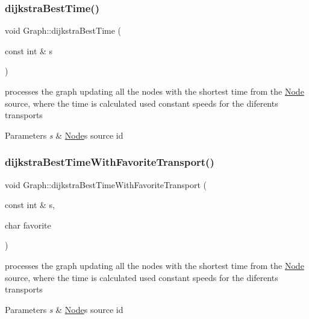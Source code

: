 \subsubsection{\texorpdfstring{dijkstra\+Best\+Time()}{dijkstraBestTime()}}
{\footnotesize\ttfamily void Graph\+::dijkstra\+Best\+Time (\begin{DoxyParamCaption}\item[{const int \&}]{s }\end{DoxyParamCaption})}



processes the graph updating all the nodes with the shortest time from the \hyperlink{class_node}{Node} source, where the time is calculated used constant speeds for the diferents transports 


\begin{DoxyParams}{Parameters}
{\em s} & \hyperlink{class_node}{Node}\textquotesingle{}s source id \\
\hline
\end{DoxyParams}
\mbox{\label{class_graph_a7bc7e3e61b1a753e8e043cf3e713cdc4}} 
\subsubsection{\texorpdfstring{dijkstra\+Best\+Time\+With\+Favorite\+Transport()}{dijkstraBestTimeWithFavoriteTransport()}}
{\footnotesize\ttfamily void Graph\+::dijkstra\+Best\+Time\+With\+Favorite\+Transport (\begin{DoxyParamCaption}\item[{const int \&}]{s,  }\item[{char}]{favorite }\end{DoxyParamCaption})}



processes the graph updating all the nodes with the shortest time from the \hyperlink{class_node}{Node} source, where the time is calculated used constant speeds for the diferents transports 


\begin{DoxyParams}{Parameters}
{\em s} & \hyperlink{class_node}{Node}\textquotesingle{}s source id \\
\hline
\end{DoxyParams}
\mbox{\label{class_graph_ae1ed9f85f6201ed1b4f095cf4533eb9c}} 
